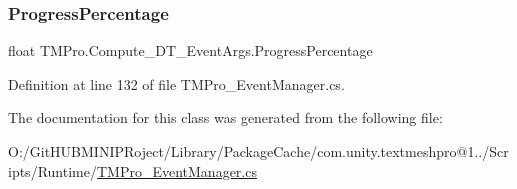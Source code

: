 \subsubsection{\texorpdfstring{ProgressPercentage}{ProgressPercentage}}
{\footnotesize\ttfamily float T\+M\+Pro.\+Compute\+\_\+\+D\+T\+\_\+\+Event\+Args.\+Progress\+Percentage}



Definition at line 132 of file T\+M\+Pro\+\_\+\+Event\+Manager.\+cs.



The documentation for this class was generated from the following file\+:\begin{DoxyCompactItemize}
\item 
O\+:/\+Git\+H\+U\+B\+M\+I\+N\+I\+P\+Roject/\+Library/\+Package\+Cache/com.\+unity.\+textmeshpro@1../\+Scripts/\+Runtime/\mbox{\hyperlink{_t_m_pro___event_manager_8cs}{T\+M\+Pro\+\_\+\+Event\+Manager.\+cs}}\end{DoxyCompactItemize}
